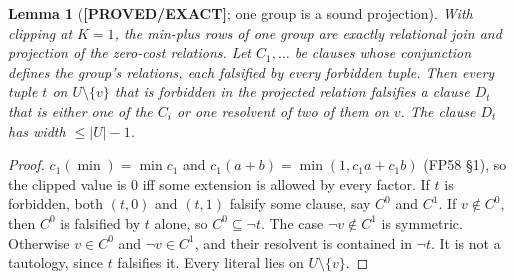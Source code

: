 \documentclass[11pt]{article}
\newtheorem{lemma}{Lemma}
\theoremstyle{definition}
\theoremstyle{remark}
\newcommand{\lab}[1]{\textbf{[#1]}}
\begin{document}
\begin{lemma}[\lab{PROVED/EXACT}; one group is a sound projection]\label{lem:group}
With clipping at $K=1$, the min-plus rows of one group are exactly relational join and
projection of the zero-cost relations. Let $C_1,\dots$ be clauses whose conjunction defines the
group's relations, each falsified by every forbidden tuple. Then every tuple $t$ on
$U\setminus\{v\}$ that is forbidden in the projected relation falsifies a clause $D_t$ that
is either one of the $C_i$ or one resolvent of two of them on $v$. The clause $D_t$ has width $\le|U|-1$.
\end{lemma}
\begin{proof}
$c_1(\min)=\min c_1$ and $c_1(a+b)=\min(1,c_1a+c_1b)$ (FP58 \S1), so the clipped value is
$0$ iff some extension is allowed by every factor. If $t$ is forbidden, both $(t,0)$ and
$(t,1)$ falsify some clause, say $C^0$ and $C^1$. If $v\notin C^0$, then $C^0$ is falsified
by $t$ alone, so $C^0\subseteq\neg t$. The case $\neg v\notin C^1$ is symmetric. Otherwise
$v\in C^0$ and $\neg v\in C^1$, and their resolvent is contained in $\neg t$. It is not a
tautology, since $t$ falsifies it. Every literal lies on $U\setminus\{v\}$.
\end{proof}
\end{document}
